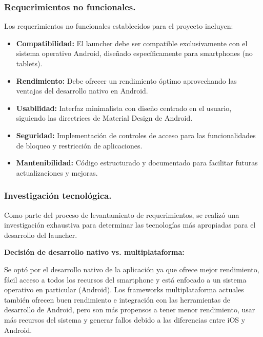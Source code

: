 \subsubsection{Requerimientos no funcionales.}

Los requerimientos no funcionales establecidos para el proyecto incluyen:

\begin{itemize}
    \item \textbf{Compatibilidad:} El launcher debe ser compatible exclusivamente con el sistema operativo Android, diseñado específicamente para smartphones (no tablets).
    
    \item \textbf{Rendimiento:} Debe ofrecer un rendimiento óptimo aprovechando las ventajas del desarrollo nativo en Android.
    
    \item \textbf{Usabilidad:} Interfaz minimalista con diseño centrado en el usuario, siguiendo las directrices de Material Design de Android.
    
    \item \textbf{Seguridad:} Implementación de controles de acceso para las funcionalidades de bloqueo y restricción de aplicaciones.
    
    \item \textbf{Mantenibilidad:} Código estructurado y documentado para facilitar futuras actualizaciones y mejoras.
\end{itemize}

\subsubsection{Investigación tecnológica.}

Como parte del proceso de levantamiento de requerimientos, se realizó una investigación exhaustiva para determinar las tecnologías más apropiadas para el desarrollo del launcher.

\textbf{Decisión de desarrollo nativo vs. multiplataforma:}

Se optó por el desarrollo nativo de la aplicación ya que ofrece mejor rendimiento, fácil acceso a todos los recursos del smartphone y está enfocado a un sistema operativo en particular (Android). Los frameworks multiplataforma actuales también ofrecen buen rendimiento e integración con las herramientas de desarrollo de Android, pero son más propensos a tener menor rendimiento, usar más recursos del sistema y generar fallos debido a las diferencias entre iOS y Android.


